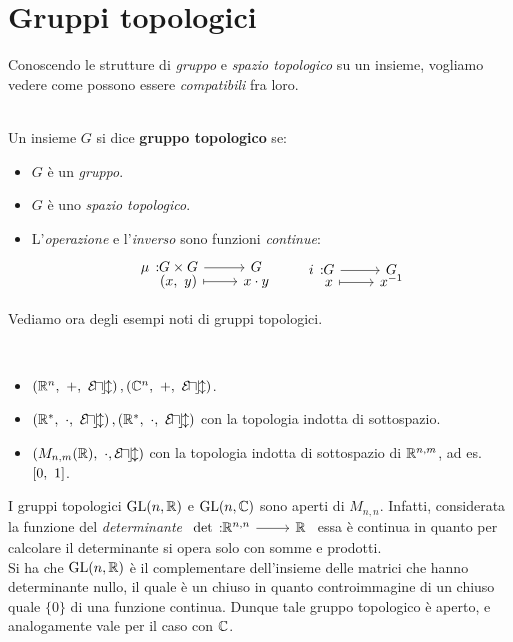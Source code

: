 \section{Gruppi topologici}
Conoscendo le strutture di \textit{gruppo} e \textit{spazio topologico} su un insieme, vogliamo vedere come possono essere \textit{compatibili} fra loro.
\begin{define}~{}\\
	Un insieme $G$ si dice \textbf{gruppo topologico} se:
		\begin{itemize}
			\item $G$ è un \textit{gruppo}.
			\item $G$ è uno \textit{spazio topologico}.
			\item L'\textit{operazione} e l'\textit{inverso} sono funzioni \textit{continue}:
			\begin{equation}
				\funztot \mu {G\times G} G {(x,\ y)} {x\cdot y}\qquad \funztot i G G x {x^{-1}}
			\end{equation}
		\end{itemize}
	\vspace{-3mm}
\end{define}
Vediamo ora degli esempi noti di gruppi topologici.
\begin{examples}~{}
	\begin{itemize}
		\item $\left( \mathbb{R}^n, \ +, \ \mathcal{E\! u\! c\! l} \right), \left( \mathbb{C} ^n, \ +, \ \mathcal{E\! u\! c\! l} \right)$.
		\item $\left( \mathbb{R}^*, \ \cdot,\ \mathcal{E\! u\! c\! l} \right), \left( \mathbb{R}^*, \ \cdot, \ \mathcal{E\! u\! c\! l} \right)$ con la topologia indotta di sottospazio.
		\item $\left( M_{n,m}(\mathbb{R}),\ \cdot, \mathcal{E\! u\! c\! l} \right)$ con la topologia indotta di sottospazio di $\mathbb{R}^{n,m}$, ad es. $\left[0,\ 1\right]$.
	\end{itemize}
\vspace{-3mm}
\end{examples}
\begin{observe}
	I gruppi topologici $\operatorname{GL} (n,\mathbb{R} )$ e $\operatorname{GL} (n, \mathbb{C} )$ sono aperti di $M_{n,n}$.\newline
	Infatti, considerata la funzione del \textit{determinante} $\funz \det {\realset^{n,n}} \realset$ essa è continua in quanto per calcolare il determinante si opera solo con somme e prodotti.\\
	Si ha che $\operatorname{GL}(n, \mathbb{R})$ è il complementare dell'insieme delle matrici che hanno determinante nullo, il quale è un chiuso in quanto controimmagine di un chiuso quale $\{0\}$ di una funzione continua. Dunque tale gruppo topologico è aperto, e analogamente vale per il caso con $\mathbb{C}$.
\end{observe}
